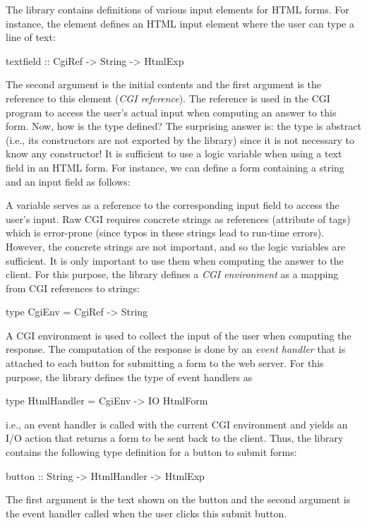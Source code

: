 The library  contains definitions of various input
elements for HTML forms.
For instance, the element  defines
an HTML input element where the user can type a line of text:
%
\begin{curry}
textfield :: CgiRef -> String -> HtmlExp
\end{curry}
%
The second argument is the initial contents and the first argument
is the reference to this element (\emph{CGI reference}).
The reference is used in the
CGI program to access the user's actual input when computing
an answer to this form.
Now, how is the type  defined?
The surprising answer is: the type is abstract (i.e., its constructors
are not exported by the  library) since
it is not necessary to know any constructor!
It is sufficient to use a logic variable when using a text field
in an HTML form.
For instance, we can define a form containing a string
and an input field as follows:
%
%
A  variable serves as a reference to the corresponding
input field to access the user's input. Raw CGI requires concrete
strings as references (attribute  of  tags)
which is error-prone (since typos in these strings lead to
run-time errors).
However, the concrete strings are not important, and so the
logic variables are sufficient. It is only important
to use them when computing the answer to the client.
For this purpose, the library  defines
a \emph{CGI environment} as a mapping
from CGI references to strings:
%
\begin{curry}
type CgiEnv = CgiRef -> String
\end{curry}
%
A CGI environment is used to collect the input of the user
when computing the response. The computation of the response is done
by an \emph{event handler}
that is attached to each button for submitting a form to the web server.
For this purpose, the library 
defines the type of event handlers as
%
\begin{curry}
type HtmlHandler = CgiEnv -> IO HtmlForm
\end{curry}
%
i.e., an event handler is called with the current CGI environment and
yields an I/O action that returns a form to be sent back to the client.
Thus, the library  contains the following type definition
for a button to submit forms:
%
\begin{curry}
button :: String -> HtmlHandler -> HtmlExp
\end{curry}
%
The first argument is the text shown on the button
and the second argument is the event handler called when the user
clicks this submit button.

